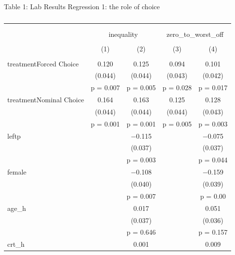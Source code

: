 \documentclass{beamer}
\begin{document}
\begin{frame}{Table 1: Lab Results Regression 1: the role of choice}
		
		\begin{block}\tiny

\begin{table}[!htbp] \centering \tiny
	\caption{} 
	\label{tbl:l1} 
	\begin{tabular}{@{\extracolsep{4pt}}lcccc} 
		\\[-1.0ex]\hline 
		\hline \\[-1.2ex] 
		\\[-1.0ex] & \multicolumn{2}{c}{inequality} & \multicolumn{2}{c}{zero\_to\_worst\_off} \\ 
		\\[-1.0ex] & (1) & (2) & (3) & (4)\\ 
		\hline \\[-1.0ex] 
		treatmentForced Choice & 0.120 & 0.125 & 0.094 & 0.101 \\ 
		& (0.044) & (0.044) & (0.043) & (0.042) \\ 
		& p = 0.007 & p = 0.005 & p = 0.028 & p = 0.017 \\ 
		treatmentNominal Choice & 0.164 & 0.163 & 0.125 & 0.128 \\ 
		& (0.044) & (0.044) & (0.044) & (0.043) \\ 
		& p = 0.001 & p = 0.001 & p = 0.005 & p = 0.003 \\ 
		leftp &  & $-$0.115 &  & $-$0.075 \\ 
		&  & (0.037) &  & (0.037) \\ 
		&  & p = 0.003 &  & p = 0.044 \\ 
		female &  & $-$0.108 &  & $-$0.159 \\ 
		&  & (0.040) &  & (0.039) \\ 
		&  & p = 0.007 &  & p = 0.00 \\ 
		age\_h &  & 0.017 &  & 0.051 \\ 
		&  & (0.037) &  & (0.036) \\ 
		&  & p = 0.646 &  & p = 0.157 \\ 
		crt\_h &  & 0.001 &  & 0.009 \\ 

\end{tabular}
\end{table}
\end{block}
\end{frame}
\end{document}
